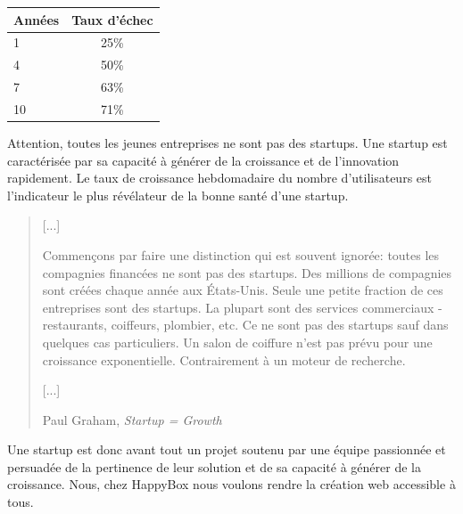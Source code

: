 \documentclass[11pt, a4paper ]{article}
\begin{document}
\begin{spacing}{1.5}
\begin{center}
	\begin{tabular}{l*{1}{c}}
		Années  & Taux d'échec\\
		\hline
		1 & 25\% \\
		4 & 50\% \\
		7 & 63\% \\
		10 & 71\% \\
	\end{tabular}\cite{statEchecStartup}
\end{center}

Attention, toutes les jeunes entreprises ne sont pas des startups. Une startup est caractérisée par sa capacité à générer de la croissance et de l'innovation rapidement. Le taux de croissance hebdomadaire du nombre d'utilisateurs est l'indicateur le plus révélateur de la bonne santé d'une startup.

\begin{quote}
	[...]

	Commençons par faire une distinction qui est souvent ignorée: toutes les compagnies financées ne sont pas des startups. Des millions de compagnies sont créées chaque année aux États-Unis. Seule une petite fraction de ces entreprises sont des startups. La plupart sont des services commerciaux - restaurants, coiffeurs, plombier, etc. Ce ne sont pas des startups sauf dans quelques cas particuliers. Un salon de coiffure n'est pas prévu pour une croissance exponentielle. Contrairement à un moteur de recherche.

	[...]


	\caption{Paul Graham, \emph{Startup = Growth\cite{startupGrowth}}}
\end{quote}

Une startup est donc avant tout un projet soutenu par une équipe passionnée et persuadée de la pertinence de leur solution et de sa capacité à générer de la croissance. Nous, chez HappyBox nous voulons rendre la création web accessible à tous.


\end{spacing}
\end{document}
